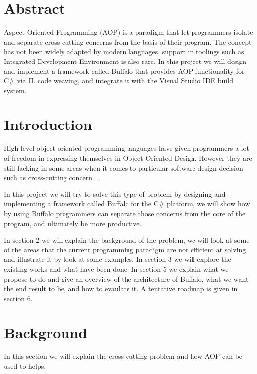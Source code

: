 \section*{Abstract}
Aspect Oriented Programming (AOP) is a paradigm that let programmers isolate and separate cross-cutting concerns from the basis of their program. The concept has not been widely adapted by modern languages, support in toolings such as Integrated Development Environment is also rare. In this project we will design and implement a framework called Buffalo that provides AOP functionality for C\# via IL code weaving, and integrate it with the Visual Studio IDE build system.
\vfill{}

\setcounter{page}{0} 
\newpage{}
\section{Introduction}
High level object oriented programming languages have given programmers a lot of freedom in expressing themselves in Object Oriented Design. However they are still lacking in some areas when it comes to particular software design decision such as cross-cutting concern ~\cite{aop}. 

In this project we will try to solve this type of problem by designing and implementing a framework called Buffalo for the C\# platform, we will show how by using Buffalo programmers can separate those concerns from the core of the program, and ultimately be more productive.

In section 2 we will explain the background of the problem, we will look at some of the areas that the current programming paradigm are not efficient at solving, and illustrate it by look at some examples. In section 3 we will explore the existing works and what have been done. In section 5 we explain what we propose to do and give an overview of the architecture of Buffalo, what we want the end result to be, and how to evaulate it. A tentative roadmap is given in section 6.

\section{Background}
In this section we will explain the cross-cutting problem and how AOP can be used to helps.

